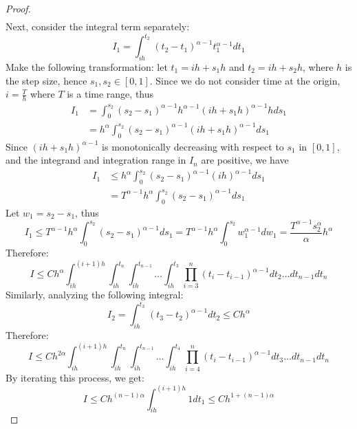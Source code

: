 \documentclass[10pt,reqno,final]{amsart}
\theoremstyle{plain}
\theoremstyle{definition}
\theoremstyle{remark}
\numberwithin{equation}{section}
\numberwithin{figure}{section}
\numberwithin{table}{section}
\begin{document}
\begin{proof}
\begin{align*}
	\end{align*}
	Next, consider the integral term separately:
	\begin{equation*}
		I_{1}=\int_{ih}^{t_{2}} (t_{2} - t_1)^{\alpha -1} t_1^{\alpha - 1} d t_1
	\end{equation*}
	Make the following transformation: let \( t_{1} = ih + s_{1}h \) and \( t_2 = ih + s_2h \), where \(h\) is the step size, hence \( s_1, s_{2} \in [0,1] \). Since we do not consider time at the origin, \(i = \frac{T}{h}\) where \(T\) is a time range, thus
	\begin{align*}
		I_1 &= \int_{0}^{s_{2}} (s_{2} - s_{1})^{\alpha -1} h^{\alpha -1} (ih + s_1h)^{\alpha - 1} h d s_1 \\
		&= h^{\alpha} \int_{0}^{s_{2}} (s_{2} - s_{1})^{\alpha -1} (ih + s_1h)^{\alpha - 1} d s_1
	\end{align*}
	Since \( (ih + s_1h)^{\alpha - 1} \) is monotonically decreasing with respect to \( s_1 \) in \( [0,1] \), and the integrand and integration range in \( I_n \) are positive, we have
	\begin{align*}
		I_1 &\le h^{\alpha} \int_{0}^{s_{2}} (s_{2} - s_{1})^{\alpha -1} (ih)^{\alpha - 1} d s_1 \\
		&= T^{\alpha - 1} h^{\alpha} \int_{0}^{s_{2}} (s_{2} - s_{1})^{\alpha -1} d s_1
	\end{align*}
	Let \( w_1 = s_{2} - s_{1} \), thus
	\begin{equation*}
		I_1 \le T^{\alpha - 1} h^{\alpha} \int_{0}^{s_{2}} (s_{2} - s_{1})^{\alpha -1} d s_1
		= T^{\alpha - 1} h^{\alpha} \int_{0}^{s_{2}} w_1^{\alpha -1} d w_1
		= \frac{T^{\alpha - 1} s_{2}^\alpha}{\alpha} h^{\alpha}
	\end{equation*}
	Therefore:
	\begin{equation*}
		I \le Ch^\alpha
		\int_{ih}^{(i+1)h}\int_{ih}^{t_n}\int_{ih}^{t_{n-1}} \ldots \int_{ih}^{t_{3}} 
		\prod_{i=3}^{n}(t_i-t_{i-1})^{\alpha -1} d t_{2} \ldots d t_{n-1} d t_n
	\end{equation*}
	Similarly, analyzing the following integral:
	\begin{equation*}
		I_{2} = \int_{ih}^{t_{3}}(t_{3}-t_{2})^{\alpha -1}
		d t_{2} \le Ch^\alpha 
	\end{equation*}
	Therefore:
	\begin{equation*}
		I \le Ch^{2\alpha}
		\int_{ih}^{(i+1)h}\int_{ih}^{t_n}\int_{ih}^{t_{n-1}} \ldots \int_{ih}^{t_{4}} 
		\prod_{i=4}^{n}(t_i-t_{i-1})^{\alpha -1} d t_{3} \ldots d t_{n-1} d t_n
	\end{equation*}
	By iterating this process, we get:
	\begin{equation*}
		I \le Ch^{(n-1)\alpha}\int_{ih}^{(i+1)h} 1 d t_1 \le Ch^{1+(n-1)\alpha}
	\end{equation*}
\end{proof}
\end{document}
